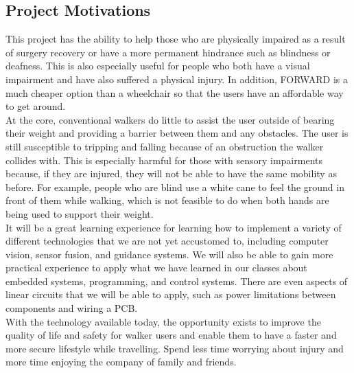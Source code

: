 \subsection{Project Motivations}
\indent This project has the ability to help those who are physically impaired as a result of surgery recovery or have a more permanent hindrance such as blindness or deafness. This is also especially useful for people who both have a visual impairment and have also suffered a physical injury. In addition, FORWARD is a much cheaper option than a wheelchair so that the users have an affordable way to get around. 
\\

\noindent At the core, conventional walkers do little to assist the user outside of bearing their weight and providing a barrier between them and any obstacles. The user is still susceptible to tripping and falling because of an obstruction the walker collides with. This is especially harmful for those with sensory impairments because, if they are injured, they will not be able to have the same mobility as before. For example, people who are blind use a white cane to feel the ground in front of them while walking, which is not feasible to do when both hands are being used to support their weight. 
\\


\noindent It will be a great learning experience for learning how to implement a variety of different technologies that we are not yet accustomed to, including computer vision, sensor fusion, and guidance systems. We will also be able to gain more practical experience to apply what we have learned in our classes about embedded systems, programming, and control systems. There are even aspects of linear circuits that we will be able to apply, such as power limitations between components and wiring a PCB. 
\\


\noindent With the technology available today, the opportunity exists to improve the quality of life and safety for walker users and enable them to have a faster and more secure lifestyle while travelling. Spend less time worrying about injury and more time enjoying the company of family and friends. \\